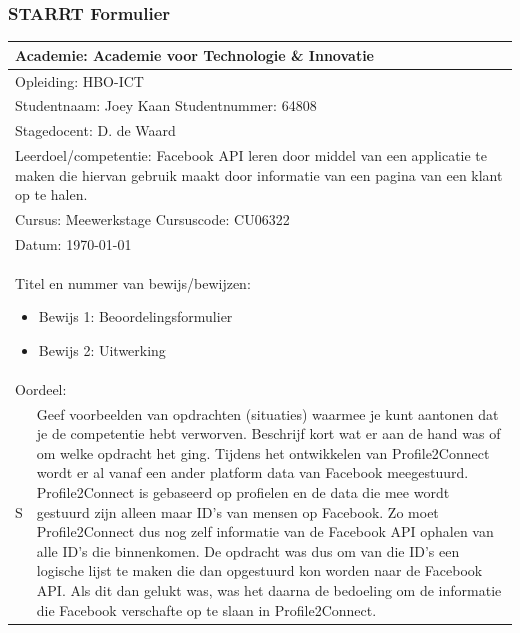 \subsubsection{STARRT Formulier}
\begin{tabularx}{\textwidth}{| l | X |}
\hline
\multicolumn{2}{|l|}{Academie: Academie voor Technologie \& Innovatie } \\
\hline
\multicolumn{2}{|l|}{Opleiding: HBO-ICT } \\
\hline
\multicolumn{2}{|l|}{Studentnaam: Joey Kaan \hspace{35pt} Studentnummer: 64808} \\
\hline
\multicolumn{2}{|l|}{Stagedocent: D. de Waard} \\
\hline
\multicolumn{2}{|p{\textwidth-1in}|}{Leerdoel/competentie: Facebook API leren door middel van een applicatie te maken die hiervan gebruik maakt door informatie van een pagina van een klant op te halen.} \\
\hline
\multicolumn{2}{|l|}{Cursus: Meewerkstage \hspace{35pt} Cursuscode: CU06322} \\
\hline
\multicolumn{2}{|l|}{Datum: \today} \\
\hline
\multicolumn{2}{|l|}{
\begin{minipage}{0.9\columnwidth}
Titel en nummer van bewijs/bewijzen:
\begin{itemize}
\item Bewijs 1: Beoordelingsformulier
\item Bewijs 2: Uitwerking
\end{itemize}
\end{minipage}
} \\ [50pt]
\hline
\multicolumn{2}{|l|}{Oordeel: } \\
\hline
S & Geef voorbeelden van opdrachten (situaties) waarmee je kunt aantonen dat je de competentie hebt verworven. Beschrijf kort wat er aan de hand was of om welke opdracht het ging.
\newline
\newline
Tijdens het ontwikkelen van Profile2Connect wordt er al vanaf een ander platform data van Facebook meegestuurd. Profile2Connect is gebaseerd op profielen en de data die mee wordt gestuurd zijn alleen maar ID's van mensen op Facebook. Zo moet Profile2Connect dus nog zelf informatie van de Facebook API ophalen van alle ID's die binnenkomen. De opdracht was dus om van die ID's een logische lijst te maken die dan opgestuurd kon worden naar de Facebook API. Als dit dan gelukt was, was het daarna de bedoeling om de informatie die Facebook verschafte op te slaan in Profile2Connect.

\end{tabularx}
